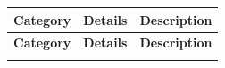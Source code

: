 \begin{table}[h!]
    {
    \setlength{\parindent}{0pt}
    \def\arraystretch{1.25}
    {\fontsize{9}{11}\selectfont
    \begin{longtable}{lp{}p{}}
        \rowcolor{gray}\textbf{\color{white}Category} & \textbf{\color{white}Details} & \textbf{\color{white}Description} \\
        \hline
        \endfirsthead %
        
        \hline
        \rowcolor{gray}\textbf{Category} & \textbf{Details} & \textbf{Description} \\
        \hline
        \endhead %
        
        \hline
        \endfoot %
        
        \hline
        \endlastfoot %


\end{longtable}}}
\end{table}
